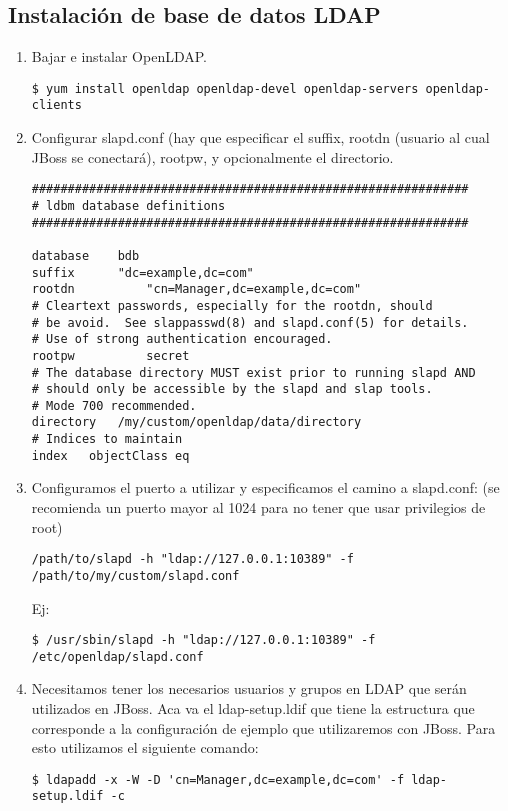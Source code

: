 \lstset{basicstyle=\footnotesize, breaklines=true, stringstyle=\ttfamily, numbers=left,
frame=single, linewidth={16cm}}
	\subsection{Instalación de base de datos LDAP}
	\begin{enumerate}
		\item Bajar e instalar OpenLDAP.
\begin{lstlisting}
$ yum install openldap openldap-devel openldap-servers openldap-clients
\end{lstlisting}
		\item Configurar slapd.conf (hay que especificar el suffix, rootdn (usuario al
cual JBoss se conectará), rootpw, y opcionalmente el directorio.
\begin{lstlisting}
#############################################################
# ldbm database definitions
#############################################################

database	bdb
suffix		"dc=example,dc=com"
rootdn        	"cn=Manager,dc=example,dc=com"
# Cleartext passwords, especially for the rootdn, should
# be avoid.  See slappasswd(8) and slapd.conf(5) for details.
# Use of strong authentication encouraged.
rootpw       	secret
# The database directory MUST exist prior to running slapd AND
# should only be accessible by the slapd and slap tools.
# Mode 700 recommended.
directory	/my/custom/openldap/data/directory
# Indices to maintain
index	objectClass	eq
\end{lstlisting}
			\item Configuramos el puerto a utilizar y especificamos el camino a slapd.conf:
(se recomienda un puerto mayor al 1024 para no tener que usar privilegios de
root)
\begin{lstlisting}
/path/to/slapd -h "ldap://127.0.0.1:10389" -f /path/to/my/custom/slapd.conf
\end{lstlisting}
 Ej:
\begin{lstlisting}
$ /usr/sbin/slapd -h "ldap://127.0.0.1:10389" -f /etc/openldap/slapd.conf
\end{lstlisting}
		\item  Necesitamos tener los necesarios usuarios y grupos en LDAP que serán
utilizados en JBoss. Aca va el ldap-setup.ldif que tiene la estructura que
corresponde a la configuración de ejemplo que utilizaremos con JBoss. Para
esto utilizamos el siguiente comando:
\begin{lstlisting}
$ ldapadd -x -W -D 'cn=Manager,dc=example,dc=com' -f ldap-setup.ldif -c
\end{lstlisting}



\end{enumerate}
